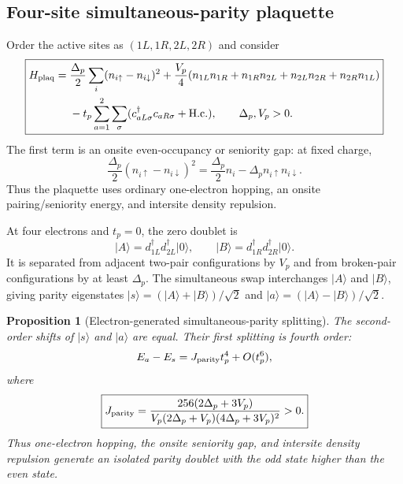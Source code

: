 \documentclass[11pt]{article}
\newtheorem{proposition}[theorem]{Proposition}
\theoremstyle{definition}
\theoremstyle{remark}
\newcommand{\ket}[1]{\lvert #1\rangle}
\begin{document}
\subsection{Four-site simultaneous-parity plaquette}

Order the active sites as $(1L,1R,2L,2R)$ and consider
\begin{equation}
\boxed{
\begin{aligned}
H_{\rm plaq}={}&
\frac{\Delta_p}{2}\sum_i(n_{i\uparrow}-n_{i\downarrow})^2
+\frac{V_p}{4}(n_{1L}n_{1R}+n_{1R}n_{2L}+n_{2L}n_{2R}+n_{2R}n_{1L})\\
&-t_p\sum_{a=1}^{2}\sum_\sigma(c_{aL\sigma}^\dagger c_{aR\sigma}+\mathrm{H.c.}),
\qquad \Delta_p,V_p>0.
\end{aligned}}
\label{eq:plaquette}
\end{equation}
The first term is an onsite even-occupancy or seniority gap: at fixed charge,
\begin{equation}
 \frac{\Delta_p}{2}(n_{i\uparrow}-n_{i\downarrow})^2
 =\frac{\Delta_p}{2}n_i-\Delta_p n_{i\uparrow}n_{i\downarrow}.
\end{equation}
Thus the plaquette uses ordinary one-electron hopping, an onsite pairing/seniority energy, and intersite density repulsion.

At four electrons and $t_p=0$, the zero doublet is
\begin{equation}
 \ket A=d_{1L}^\dagger d_{2L}^\dagger\ket0,
 \qquad
 \ket B=d_{1R}^\dagger d_{2R}^\dagger\ket0.
\end{equation}
It is separated from adjacent two-pair configurations by $V_p$ and from broken-pair configurations by at least $\Delta_p$.  The simultaneous swap interchanges $\ket A$ and $\ket B$, giving parity eigenstates $\ket s=(\ket A+\ket B)/\sqrt2$ and $\ket a=(\ket A-\ket B)/\sqrt2$.

\begin{proposition}[Electron-generated simultaneous-parity splitting]
\label{prop:plaquette-splitting}
The second-order shifts of $\ket s$ and $\ket a$ are equal.  Their first splitting is fourth order:
\begin{equation}
 E_a-E_s=J_{\rm parity}t_p^4+O(t_p^6),
 \label{eq:parity-splitting}
\end{equation}
where
\begin{equation}
 \boxed{J_{\rm parity}=
 \frac{256(2\Delta_p+3V_p)}
 {V_p(2\Delta_p+V_p)(4\Delta_p+3V_p)^2}>0.}
 \label{eq:Jparity}
\end{equation}
Thus one-electron hopping, the onsite seniority gap, and intersite density repulsion generate an isolated parity doublet with the odd state higher than the even state.
\end{proposition}
\end{document}
